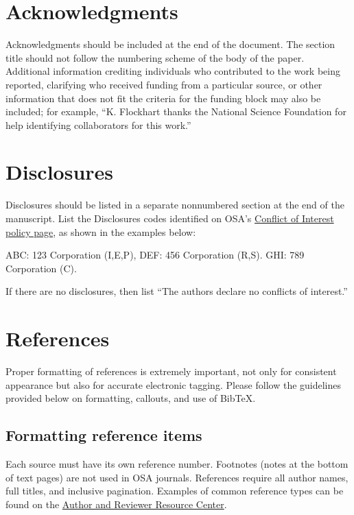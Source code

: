 \documentclass{osa-article}
\begin{document}
\section*{Acknowledgments}
Acknowledgments should be included at the end of the document. The section title should not follow the numbering scheme of the body of the paper. Additional information crediting individuals who contributed to the work being reported, clarifying who received funding from a particular source, or other information that does not fit the criteria for the funding block may also be included; for example, ``K. Flockhart thanks the National Science Foundation for help identifying collaborators for this work.''

\section*{Disclosures}

Disclosures should be listed in a separate nonnumbered section at the end of the manuscript. List the Disclosures codes identified on OSA's \href{http://www.osapublishing.org/submit/review/conflicts-interest-policy.cfm}{Conflict of Interest policy page}, as shown in the examples below:

\medskip

\noindent ABC: 123 Corporation (I,E,P), DEF: 456 Corporation (R,S). GHI: 789 Corporation (C).

\medskip

\noindent If there are no disclosures, then list ``The authors declare no conflicts of interest.''


\section{References}
\label{sec:refs}
Proper formatting of references is extremely important, not only for consistent appearance but also for accurate electronic tagging. Please follow the guidelines provided below on formatting, callouts, and use of Bib\TeX.

\subsection{Formatting reference items}
Each source must have its own reference number. Footnotes (notes at the bottom of text pages) are not used in OSA journals. References require all author names, full titles, and inclusive pagination. Examples of common reference types can be found on the  \href{http://www.osapublishing.org/submit/style/style_traditional_journals.cfm} {Author and Reviewer Resource Center}.
\end{document}
